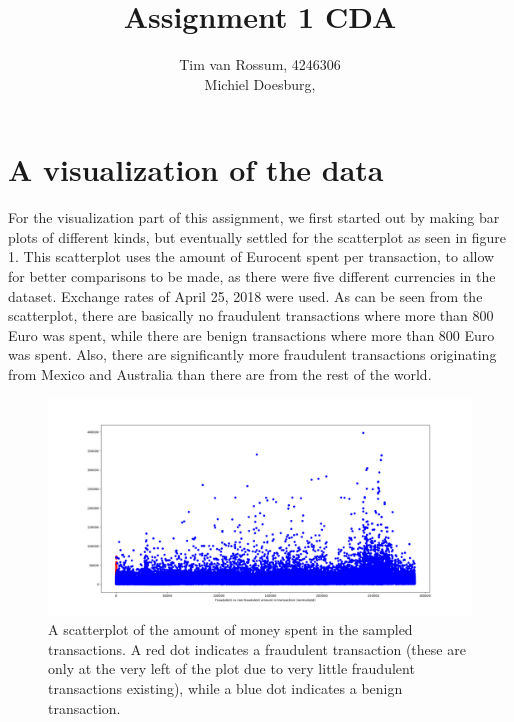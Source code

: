 \documentclass[]{article}
\title{Assignment 1 CDA}
\author{Tim van Rossum, 4246306\\
	Michiel Doesburg,}
\begin{document}
\maketitle

\section{A visualization of the data}
For the visualization part of this assignment, we first started out by making bar plots of different kinds, but eventually settled  for the scatterplot as seen in figure 1. This scatterplot uses the amount of Eurocent spent per transaction, to allow for better comparisons to be made, as there were five different currencies in the dataset. Exchange rates of April 25, 2018 were used. As can be seen from the scatterplot, there are basically no fraudulent transactions where more than 800 Euro was spent, while there are benign transactions where more than 800 Euro was spent. Also, there are significantly more fraudulent transactions originating from Mexico and Australia than there are from the rest of the world. 
\begin{figure}[h!]
	\centering
	\includegraphics[scale = 0.25]{Visualizations/fraud_vs_nonfraud_better}
	\caption{A scatterplot of the amount of money spent in the sampled transactions. A red dot indicates a fraudulent transaction (these are only at the very left of the plot due to very little fraudulent transactions existing), while a blue dot indicates a benign transaction.}
\end{figure}
\clearpage
\end{document}
